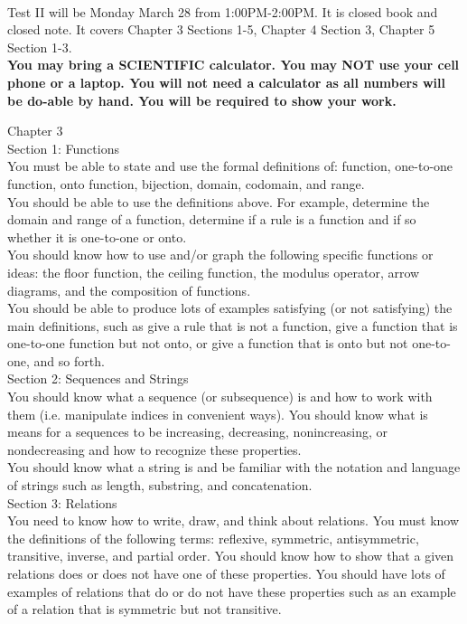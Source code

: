 \documentclass[12pt]{article}
\begin{document}
\thispagestyle{fancy}
\quad\\

Test II will be Monday March 28 from 1:00PM-2:00PM. It is closed book and closed note. It covers Chapter 3 Sections 1-5, Chapter 4 Section 3, Chapter 5 Section 1-3. \\

\textbf{You may bring a SCIENTIFIC calculator. You may NOT use your cell phone or a laptop. You will not need a calculator as all numbers will be do-able by hand. You will be required to show your work.}\\

\noindent\hrulefill

Chapter 3 \\

Section 1: Functions\\
You must be able to state and use the formal definitions of: function, one-to-one function, onto function, bijection, domain, codomain, and range.\\
You should be able to use the definitions above. For example, determine the domain and range of a function, determine if a rule is a function and if so whether it is one-to-one or onto.\\
You should know how to use and/or graph the following specific functions or ideas: the floor function, the ceiling function, the modulus operator, arrow diagrams, and the composition of functions.\\
You should be able to produce lots of examples satisfying (or not satisfying) the main definitions, such as give a rule that is not a function, give a function that is  one-to-one function but not onto, or give a function that is onto but  not one-to-one, and so forth.\\


Section 2: Sequences and Strings\\
You should know what a sequence (or subsequence) is and how to work with them (i.e. manipulate indices in convenient ways). You should know what is means for a sequences to be increasing, decreasing, nonincreasing, or nondecreasing and how to recognize these properties.\\
You should know what a string is and be familiar with the notation and language of strings such as length, substring, and concatenation.\\

Section 3: Relations\\
You need to know how to write, draw, and think about relations. You must know the definitions of the following terms: reflexive, symmetric, antisymmetric, transitive, inverse, and partial order. You should know how to show that a given relations does or does not have one of these properties. You should have lots of examples of relations that do or do not have these properties such as an example of a relation that is symmetric but not transitive.\\
\end{document}
